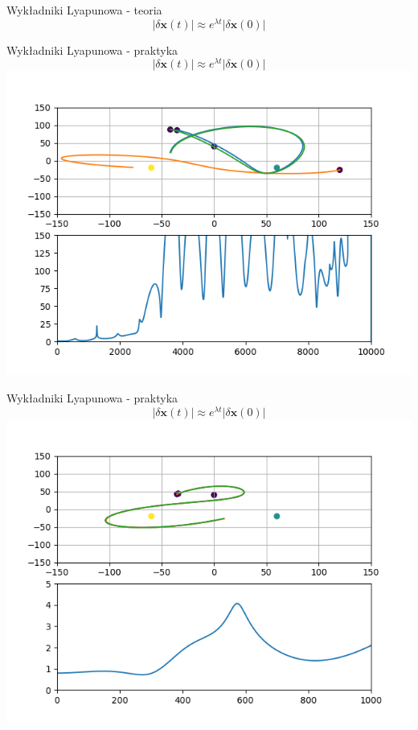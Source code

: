 \documentclass{beamer}
\begin{document}
\begin{frame}[t]{Wykładniki Lyapunowa - teoria}
\begin{equation*}
| \delta\mathbf{x}(t) | \approx e^{\lambda t} | \delta \mathbf{x}(0) |
\end{equation*}
\end{frame}

\begin{frame}[t]{Wykładniki Lyapunowa - praktyka}
\begin{equation*}
| \delta\mathbf{x}(t) | \approx e^{\lambda t} | \delta \mathbf{x}(0) |
\end{equation*}
\centering
\includegraphics[height=0.7\textheight]{lyapunov}
\end{frame}

\begin{frame}[t]{Wykładniki Lyapunowa - praktyka}
\begin{equation*}
| \delta\mathbf{x}(t) | \approx e^{\lambda t} | \delta \mathbf{x}(0) |
\end{equation*}
\centering
\includegraphics[height=0.7\textheight]{lyapunov_short}
\end{frame}
\end{document}
